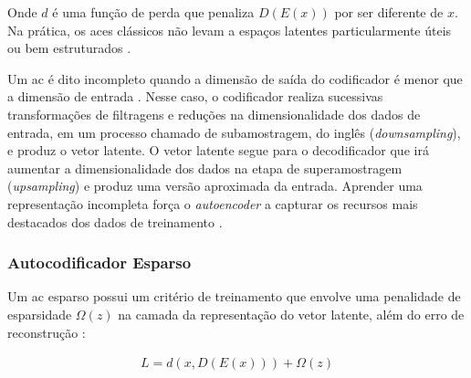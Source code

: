 Onde $d$ é uma função de perda que penaliza $D(E(x))$  por ser diferente de $x$. Na prática, os \acrshort{ac}es clássicos não levam a espaços latentes particularmente úteis ou bem estruturados \cite{FrancoisDeepLearning}. 



Um \acrshort{ac} é dito incompleto quando a dimensão de saída do codificador é menor que a dimensão de entrada \cite{Goodfellow2016}. Nesse caso, o codificador realiza sucessivas transformações de filtragens e reduções na dimensionalidade dos dados de entrada, em um processo chamado de subamostragem, do inglês (\textit{downsampling}), e produz o vetor latente. O vetor latente segue para o decodificador que irá aumentar a dimensionalidade dos dados na etapa de superamostragem (\textit{upsampling}) e produz uma versão aproximada da entrada. Aprender uma representação incompleta força o \textit{autoencoder}  a capturar os recursos mais destacados dos dados de treinamento \cite{Goodfellow2016}. 








\subsubsection{Autocodificador Esparso} \label{sec:ac_es}

Um \acrshort{ac} esparso possui um critério de treinamento que envolve uma penalidade de esparsidade $\Omega(z)$ na camada da representação do vetor latente, além do erro de reconstrução \cite{Goodfellow2016}:

\begin{equation}
\label{eq:loss_sparse}
\begin{aligned}
L = d(x,D(E(x))) + \Omega(z) 
\end{aligned}
\end{equation}


